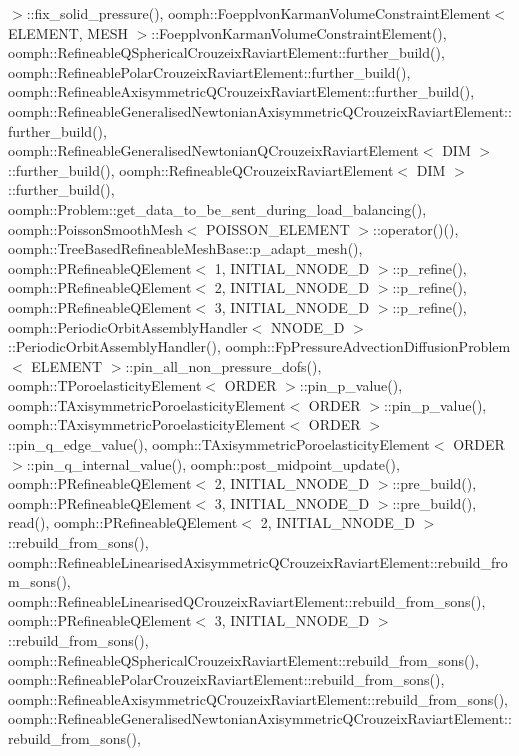$>$\+::fix\+\_\+solid\+\_\+pressure(), oomph\+::\+Foepplvon\+Karman\+Volume\+Constraint\+Element$<$ E\+L\+E\+M\+E\+N\+T, M\+E\+S\+H $>$\+::\+Foepplvon\+Karman\+Volume\+Constraint\+Element(), oomph\+::\+Refineable\+Q\+Spherical\+Crouzeix\+Raviart\+Element\+::further\+\_\+build(), oomph\+::\+Refineable\+Polar\+Crouzeix\+Raviart\+Element\+::further\+\_\+build(), oomph\+::\+Refineable\+Axisymmetric\+Q\+Crouzeix\+Raviart\+Element\+::further\+\_\+build(), oomph\+::\+Refineable\+Generalised\+Newtonian\+Axisymmetric\+Q\+Crouzeix\+Raviart\+Element\+::further\+\_\+build(), oomph\+::\+Refineable\+Generalised\+Newtonian\+Q\+Crouzeix\+Raviart\+Element$<$ D\+I\+M $>$\+::further\+\_\+build(), oomph\+::\+Refineable\+Q\+Crouzeix\+Raviart\+Element$<$ D\+I\+M $>$\+::further\+\_\+build(), oomph\+::\+Problem\+::get\+\_\+data\+\_\+to\+\_\+be\+\_\+sent\+\_\+during\+\_\+load\+\_\+balancing(), oomph\+::\+Poisson\+Smooth\+Mesh$<$ P\+O\+I\+S\+S\+O\+N\+\_\+\+E\+L\+E\+M\+E\+N\+T $>$\+::operator()(), oomph\+::\+Tree\+Based\+Refineable\+Mesh\+Base\+::p\+\_\+adapt\+\_\+mesh(), oomph\+::\+P\+Refineable\+Q\+Element$<$ 1, I\+N\+I\+T\+I\+A\+L\+\_\+\+N\+N\+O\+D\+E\+\_\+D $>$\+::p\+\_\+refine(), oomph\+::\+P\+Refineable\+Q\+Element$<$ 2, I\+N\+I\+T\+I\+A\+L\+\_\+\+N\+N\+O\+D\+E\+\_\+D $>$\+::p\+\_\+refine(), oomph\+::\+P\+Refineable\+Q\+Element$<$ 3, I\+N\+I\+T\+I\+A\+L\+\_\+\+N\+N\+O\+D\+E\+\_\+D $>$\+::p\+\_\+refine(), oomph\+::\+Periodic\+Orbit\+Assembly\+Handler$<$ N\+N\+O\+D\+E\+\_\+D $>$\+::\+Periodic\+Orbit\+Assembly\+Handler(), oomph\+::\+Fp\+Pressure\+Advection\+Diffusion\+Problem$<$ E\+L\+E\+M\+E\+N\+T $>$\+::pin\+\_\+all\+\_\+non\+\_\+pressure\+\_\+dofs(), oomph\+::\+T\+Poroelasticity\+Element$<$ O\+R\+D\+E\+R $>$\+::pin\+\_\+p\+\_\+value(), oomph\+::\+T\+Axisymmetric\+Poroelasticity\+Element$<$ O\+R\+D\+E\+R $>$\+::pin\+\_\+p\+\_\+value(), oomph\+::\+T\+Axisymmetric\+Poroelasticity\+Element$<$ O\+R\+D\+E\+R $>$\+::pin\+\_\+q\+\_\+edge\+\_\+value(), oomph\+::\+T\+Axisymmetric\+Poroelasticity\+Element$<$ O\+R\+D\+E\+R $>$\+::pin\+\_\+q\+\_\+internal\+\_\+value(), oomph\+::post\+\_\+midpoint\+\_\+update(), oomph\+::\+P\+Refineable\+Q\+Element$<$ 2, I\+N\+I\+T\+I\+A\+L\+\_\+\+N\+N\+O\+D\+E\+\_\+D $>$\+::pre\+\_\+build(), oomph\+::\+P\+Refineable\+Q\+Element$<$ 3, I\+N\+I\+T\+I\+A\+L\+\_\+\+N\+N\+O\+D\+E\+\_\+D $>$\+::pre\+\_\+build(), read(), oomph\+::\+P\+Refineable\+Q\+Element$<$ 2, I\+N\+I\+T\+I\+A\+L\+\_\+\+N\+N\+O\+D\+E\+\_\+D $>$\+::rebuild\+\_\+from\+\_\+sons(), oomph\+::\+Refineable\+Linearised\+Axisymmetric\+Q\+Crouzeix\+Raviart\+Element\+::rebuild\+\_\+from\+\_\+sons(), oomph\+::\+Refineable\+Linearised\+Q\+Crouzeix\+Raviart\+Element\+::rebuild\+\_\+from\+\_\+sons(), oomph\+::\+P\+Refineable\+Q\+Element$<$ 3, I\+N\+I\+T\+I\+A\+L\+\_\+\+N\+N\+O\+D\+E\+\_\+D $>$\+::rebuild\+\_\+from\+\_\+sons(), oomph\+::\+Refineable\+Q\+Spherical\+Crouzeix\+Raviart\+Element\+::rebuild\+\_\+from\+\_\+sons(), oomph\+::\+Refineable\+Polar\+Crouzeix\+Raviart\+Element\+::rebuild\+\_\+from\+\_\+sons(), oomph\+::\+Refineable\+Axisymmetric\+Q\+Crouzeix\+Raviart\+Element\+::rebuild\+\_\+from\+\_\+sons(), oomph\+::\+Refineable\+Generalised\+Newtonian\+Axisymmetric\+Q\+Crouzeix\+Raviart\+Element\+::rebuild\+\_\+from\+\_\+sons(), 